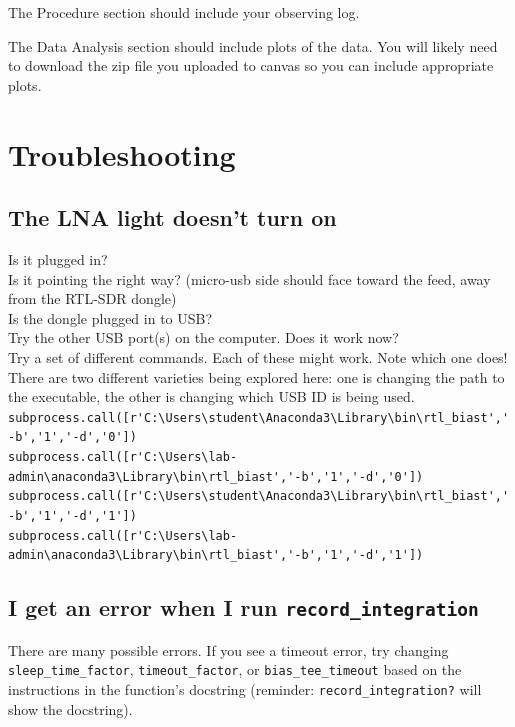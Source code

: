 \documentclass[11pt]{article}
\begin{document}
The Procedure section should include your observing log.

The Data Analysis section should include plots of the data.
You will likely need to download the zip file you uploaded to canvas
so you can include appropriate plots.






\section{Troubleshooting}
\label{sec:troubleshooting}
\subsection{The LNA light doesn't turn on}

Is it plugged in?\\

Is it pointing the right way?  (micro-usb side should face toward the feed, away from the RTL-SDR dongle)\\

Is the dongle plugged in to USB?\\
Try the other USB port(s) on the computer.  Does it work now?\\

Try a set of different commands.  Each of these might work.  Note which one
does!  There are two different varieties being explored here: one is changing
the path to the executable, the other is changing which USB ID is being used. \\
\verb|subprocess.call([r'C:\Users\student\Anaconda3\Library\bin\rtl_biast','-b','1','-d','0'])| \\
\verb|subprocess.call([r'C:\Users\lab-admin\anaconda3\Library\bin\rtl_biast','-b','1','-d','0'])| \\
\verb|subprocess.call([r'C:\Users\student\Anaconda3\Library\bin\rtl_biast','-b','1','-d','1'])| \\
\verb|subprocess.call([r'C:\Users\lab-admin\anaconda3\Library\bin\rtl_biast','-b','1','-d','1'])| \\

\subsection{I get an error when I run \texttt{record\_integration}}
There are many possible errors.  If you see a timeout error,
try changing \verb|sleep_time_factor|, \verb|timeout_factor|,
or \verb|bias_tee_timeout| based on the instructions in the
function's docstring (reminder: \verb|record_integration?| will
show the docstring).
\end{document}
